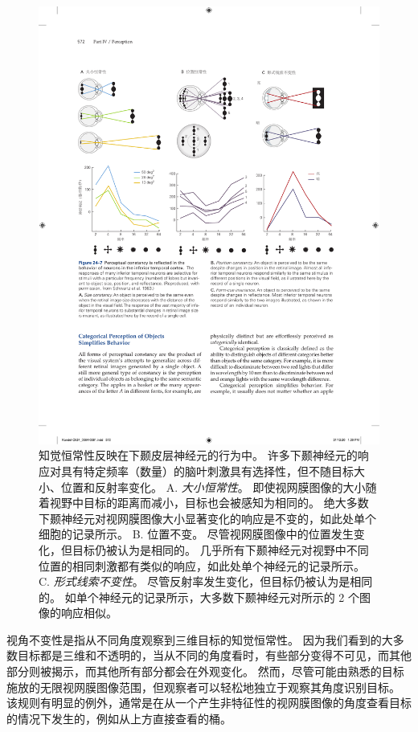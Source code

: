 \begin{figure}[htbp]
	\centering
	\includegraphics[width=1.0\linewidth]{chap24/fig_24_7}
	\caption{知觉恒常性反映在下颞皮层神经元的行为中。
		许多下颞神经元的响应对具有特定频率（数量）的脑叶刺激具有选择性，但不随目标大小、位置和反射率变化。
		A. \textit{大小恒常性}。
		即使视网膜图像的大小随着视野中目标的距离而减小，目标也会被感知为相同的。
		绝大多数下颞神经元对视网膜图像大小显著变化的响应是不变的，如此处单个细胞的记录所示。
		B. 位置不变。
		尽管视网膜图像中的位置发生变化，但目标仍被认为是相同的。
		几乎所有下颞神经元对视野中不同位置的相同刺激都有类似的响应，如此处单个神经元的记录所示。
		C. \textit{形式线索不变性}。
		尽管反射率发生变化，但目标仍被认为是相同的。
		如单个神经元的记录所示，大多数下颞神经元对所示的 2 个图像的响应相似。}
	\label{fig:24_7}
\end{figure}


视角不变性是指从不同角度观察到三维目标的知觉恒常性。
因为我们看到的大多数目标都是三维和不透明的，当从不同的角度看时，有些部分变得不可见，而其他部分则被揭示，而其他所有部分都会在外观变化。
然而，尽管可能由熟悉的目标施放的无限视网膜图像范围，但观察者可以轻松地独立于观察其角度识别目标。
该规则有明显的例外，通常是在从一个产生非特征性的视网膜图像的角度查看目标的情况下发生的，例如从上方直接查看的桶。


